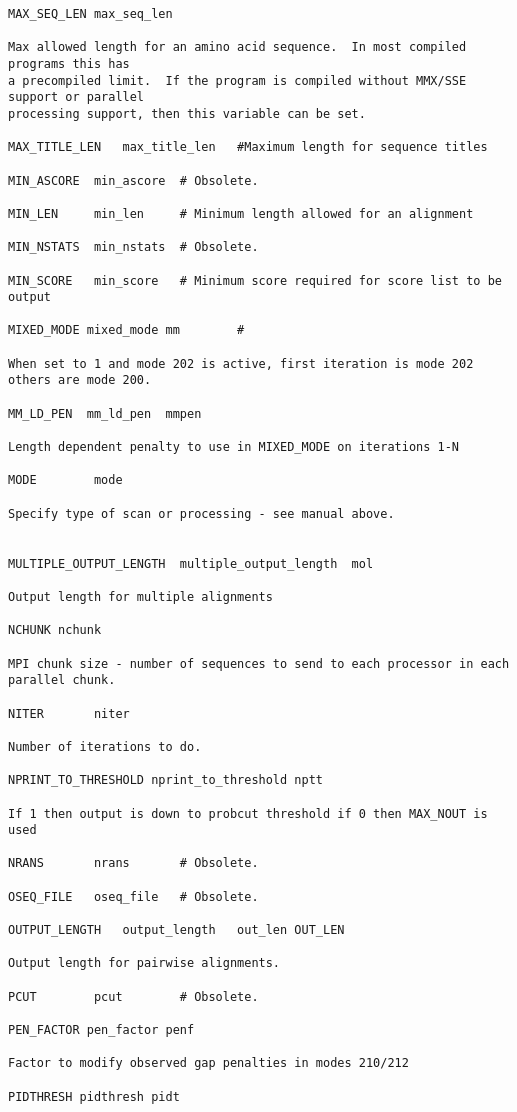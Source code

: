 \documentclass[12pt]{article}
\begin{document}
\begin{scriptsize}
\begin{verbatim}
MAX_SEQ_LEN	max_seq_len	

Max allowed length for an amino acid sequence.  In most compiled programs this has
a precompiled limit.  If the program is compiled without MMX/SSE support or parallel
processing support, then this variable can be set.

MAX_TITLE_LEN	max_title_len	#Maximum length for sequence titles

MIN_ASCORE	min_ascore	# Obsolete.

MIN_LEN		min_len		# Minimum length allowed for an alignment

MIN_NSTATS	min_nstats	# Obsolete.

MIN_SCORE	min_score	# Minimum score required for score list to be output

MIXED_MODE mixed_mode mm        # 

When set to 1 and mode 202 is active, first iteration is mode 202
others are mode 200.

MM_LD_PEN  mm_ld_pen  mmpen     

Length dependent penalty to use in MIXED_MODE on iterations 1-N

MODE		mode

Specify type of scan or processing - see manual above.


MULTIPLE_OUTPUT_LENGTH	multiple_output_length	mol 

Output length for multiple alignments

NCHUNK nchunk 

MPI chunk size - number of sequences to send to each processor in each
parallel chunk.

NITER		niter

Number of iterations to do.

NPRINT_TO_THRESHOLD nprint_to_threshold nptt  

If 1 then output is down to probcut threshold if 0 then MAX_NOUT is
used

NRANS		nrans		# Obsolete.

OSEQ_FILE	oseq_file	# Obsolete.

OUTPUT_LENGTH	output_length	out_len	OUT_LEN 

Output length for pairwise alignments.

PCUT		pcut		# Obsolete.

PEN_FACTOR pen_factor penf

Factor to modify observed gap penalties in modes 210/212

PIDTHRESH pidthresh pidt        


\end{verbatim}
\end{scriptsize}
\end{document}
